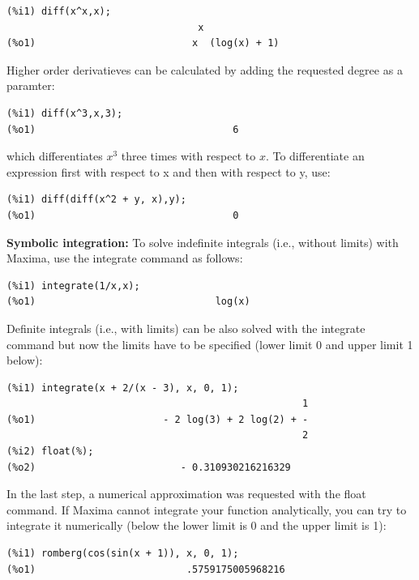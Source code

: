 \documentclass[byrevtex,amssymb,aps,pra,floatfix,letterpaper]{revtex4}
\begin{document}
\begin{verbatim}
(%i1) diff(x^x,x);
                                 x
(%o1)                           x  (log(x) + 1)
\end{verbatim}

\noindent
Higher order derivatieves can be calculated by adding the requested degree as a paramter:

\begin{verbatim}
(%i1) diff(x^3,x,3);
(%o1)                                  6
\end{verbatim}

\noindent
which differentiates $x^3$ three times with respect to $x$. To differentiate an expression first with respect to x and then with respect to y, use:

\begin{verbatim}
(%i1) diff(diff(x^2 + y, x),y);
(%o1)                                  0
\end{verbatim}

\noindent
\textbf{Symbolic integration:} To solve indefinite integrals (i.e., without limits) with Maxima, use the integrate command as follows:

\begin{verbatim}
(%i1) integrate(1/x,x);
(%o1)                               log(x)
\end{verbatim}

\noindent
Definite integrals (i.e., with limits) can be also solved with the integrate command but now the limits have to be specified (lower limit 0 and upper limit 1 below):

\begin{verbatim}
(%i1) integrate(x + 2/(x - 3), x, 0, 1);
                                                   1
(%o1)                      - 2 log(3) + 2 log(2) + -
                                                   2
(%i2) float(%);
(%o2)                         - 0.310930216216329
\end{verbatim}

\noindent
In the last step, a numerical approximation was requested with the float command. If Maxima cannot integrate your function analytically, you can try to integrate it numerically (below the lower limit is 0 and the upper limit is 1):

\begin{verbatim}
(%i1) romberg(cos(sin(x + 1)), x, 0, 1);
(%o1)                          .5759175005968216
\end{verbatim}
\end{document}
